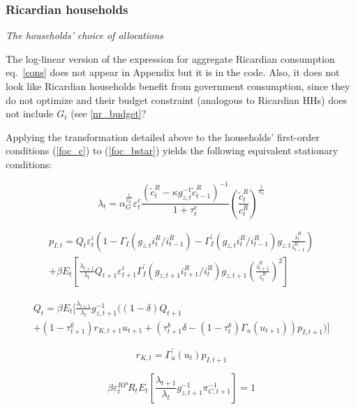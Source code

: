 \documentclass[a4paper,11pt]{article}
\numberwithin{equation}{section}
\begin{document}
	\subsubsection{Ricardian households}

	\vspace{8pt}
	\textit{The households' choice of allocations}
	\vspace{8pt}
	
	{\color{red} The log-linear version of the expression for aggregate Ricardian consumption eq.~\ref{cons} does not appear in Appendix but it is in the code. Also, it does not look like Ricardian households benefit from government consumption, since they do not optimize and their budget constraint (analogous to Ricardian HHs) does not include $G_t$ (see \ref{nr_budget}?}
	
	Applying the transformation detailed above to the households'
	first-order conditions (\ref{foc_c}) to (\ref{foc_bstar}) yields the following equivalent stationary conditions:
	
	\begin{equation}
	\lambda_t=\alpha_G^{\frac{1}{\nu_G}}\varepsilon_t^c\frac{\left(\tilde{c}_t^R-\kappa g_{z,t}^{-1}\tilde{c}_{t-1}^R\right)^{-1}}{1+\tau_t^c}\left(\frac{\tilde{c}_t^R}{c_t^R}\right)^{\frac{1}{\nu_G}}
	\end{equation}
	
	\begin{multline}
	p_{I,t} = Q_t\varepsilon_t^i\left(1-\Gamma_I\left(g_{z,t}i_t^R/i_{t-1}^R\right)-\Gamma_I^'\left(g_{z,t}i_t^R/i_{t-1}^R\right)g_{z,t}\frac{i_t^R}{i_{t-1}^R}\right)\\+\beta E_t\left[\frac{\lambda_{t+1}}{\lambda_t}Q_{t+1}\varepsilon_{t+1}^i\Gamma_I^'\left(g_{z,t+1}i_{t+1}^R/i_{t}^R\right)g_{z,t+1}\left(\frac{i_{t+1}^R}{i_{t}^R}\right)^2\right]
	\end{multline}
	
	\begin{multline}
	Q_t=\beta E_t\Bigg[\frac{\lambda_{t+1}}{\lambda_t}g_{z,t+1}^{-1}\Big((1-\delta)Q_{t+1} \\ +(1-\tau_{t+1}^k)r_{K,t+1}u_{t+1}+\left(\tau_{t+1}^k\delta-\left(1-\tau_t^k\right)\Gamma_u(u_{t+1})\right)p_{I,t+1}\Big)\Bigg]
	\end{multline}
	
	\begin{equation}
	r_{K,t}=\Gamma_u^'(u_t)p_{I,t+1}
	\end{equation}
	
	\begin{equation} 
	\beta\varepsilon_t^{RP}R_tE_t\left[\frac{\lambda_{t+1}}{\lambda_t}g_{z,t+1}^{-1}\pi_{C,t+1}^{-1}\right]=1
	\end{equation}
	
\end{document}
